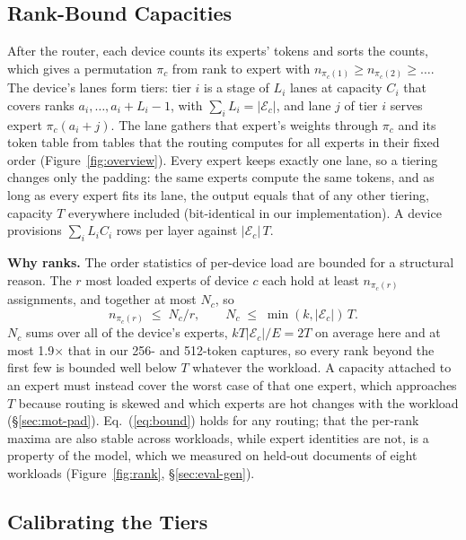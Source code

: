 \subsection{Rank-Bound Capacities}
\label{sec:sort}\label{sec:tiers}

After the router, each device counts its experts' tokens and sorts the counts, which gives a permutation $\pi_c$ from rank
to expert with $n_{\pi_c(1)}\ge n_{\pi_c(2)}\ge\dots$. The device's lanes form tiers: tier $i$ is a stage of $L_i$ lanes
at capacity $C_i$ that covers ranks $a_i,\dots,a_i+L_i-1$, with $\sum_iL_i=|\mathcal{E}_c|$, and lane $j$ of tier $i$
serves expert $\pi_c(a_i+j)$. The lane gathers that expert's weights through $\pi_c$ and its token table from tables
that the routing computes for all experts in their fixed order (Figure~\ref{fig:overview}). Every expert keeps exactly one
lane, so a tiering changes only the padding: the same experts compute the same tokens, and as long as every expert fits
its lane, the output equals that of any other tiering, capacity $T$ everywhere included (bit-identical in our
implementation). A device provisions $\sum_iL_iC_i$ rows per layer against $|\mathcal{E}_c|\,T$.

\textbf{Why ranks.} The order statistics of per-device load are bounded for a structural reason. The $r$ most loaded
experts of device $c$ each hold at least $n_{\pi_c(r)}$ assignments, and together at most $N_c$, so
\begin{equation}
n_{\pi_c(r)}\;\le\;N_c/r,\qquad N_c\;\le\;\min(k,|\mathcal{E}_c|)\,T .
\label{eq:bound}
\end{equation}
$N_c$ sums over all of the device's experts, $kT|\mathcal{E}_c|/E=2T$ on average here and at most 1.9$\times$ that in our
256- and 512-token captures, so every rank beyond the first few is bounded well below $T$ whatever the workload. A capacity
attached to an expert must instead cover the worst case of that one expert, which approaches $T$ because routing is
skewed and which experts are hot changes with the workload (\S\ref{sec:mot-pad}). Eq.~(\ref{eq:bound}) holds for any
routing; that the per-rank maxima are also stable across workloads, while expert identities are not, is a property of the
model, which we measured on held-out documents of eight workloads (Figure~\ref{fig:rank}, \S\ref{sec:eval-gen}).

\subsection{Calibrating the Tiers}
\label{sec:calib}

